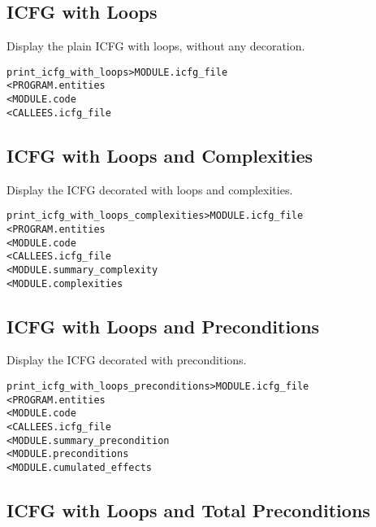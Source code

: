 \documentclass[a4paper]{report}
\newenvironment{PipsMake}{\begin{alltt}}{\end{alltt}}
\newenvironment{PipsPass}[1]{\label{pass:#1}}{}
\begin{document}
\subsection{ICFG with Loops}

\begin{PipsPass}{print_icfg_with_loops}
Display the plain ICFG with loops, without any decoration.
\end{PipsPass}
\begin{PipsMake}
print_icfg_with_loops                    > MODULE.icfg_file
        < PROGRAM.entities
        < MODULE.code
        < CALLEES.icfg_file
\end{PipsMake}

\subsection{ICFG with Loops and Complexities}

\begin{PipsPass}{print_icfg_with_loops_complexities}
Display the ICFG decorated with loops and complexities.
\end{PipsPass}
\begin{PipsMake}
print_icfg_with_loops_complexities       > MODULE.icfg_file
        < PROGRAM.entities
        < MODULE.code
        < CALLEES.icfg_file
        < MODULE.summary_complexity
        < MODULE.complexities
\end{PipsMake}

\subsection{ICFG with Loops and Preconditions}

\begin{PipsPass}{print_icfg_with_loops_preconditions}
Display the ICFG decorated with preconditions.
\end{PipsPass}
\begin{PipsMake}
print_icfg_with_loops_preconditions      > MODULE.icfg_file
        < PROGRAM.entities
        < MODULE.code
        < CALLEES.icfg_file
        < MODULE.summary_precondition
        < MODULE.preconditions
        < MODULE.cumulated_effects
\end{PipsMake}

\subsection{ICFG with Loops and Total Preconditions}
\end{document}
